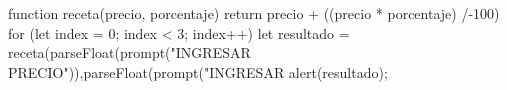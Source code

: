 function receta(precio, porcentaje){
    return precio + ((precio * porcentaje) /-100)
}
for (let index = 0; index < 3; index++) {
    let resultado = receta(parseFloat(prompt("INGRESAR PRECIO")),parseFloat(prompt("INGRESAR %
    alert(resultado);
}